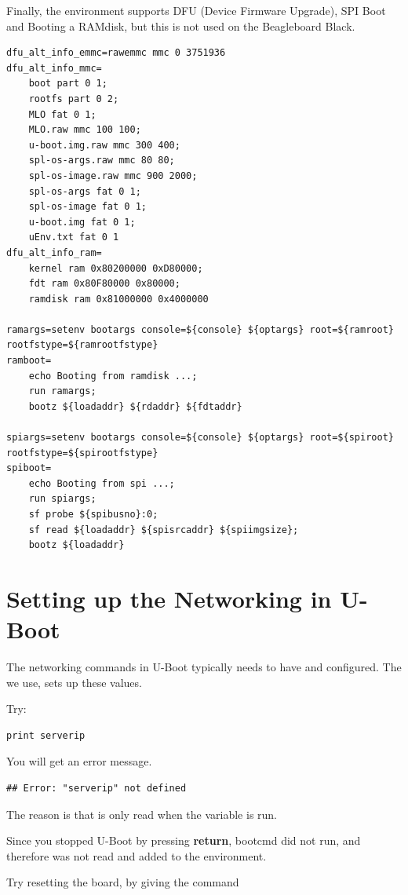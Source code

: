 \clearpage

Finally, the environment supports DFU (Device Firmware Upgrade), SPI Boot and Booting a RAMdisk,
but this is not used on the Beagleboard Black.

\begin{lstlisting}
dfu_alt_info_emmc=rawemmc mmc 0 3751936
dfu_alt_info_mmc=
	boot part 0 1;
	rootfs part 0 2;
	MLO fat 0 1;
	MLO.raw mmc 100 100;
	u-boot.img.raw mmc 300 400;
	spl-os-args.raw mmc 80 80;
	spl-os-image.raw mmc 900 2000;
	spl-os-args fat 0 1;
	spl-os-image fat 0 1;
	u-boot.img fat 0 1;
	uEnv.txt fat 0 1
dfu_alt_info_ram=
	kernel ram 0x80200000 0xD80000;
	fdt ram 0x80F80000 0x80000;
	ramdisk ram 0x81000000 0x4000000

ramargs=setenv bootargs console=${console} ${optargs} root=${ramroot} rootfstype=${ramrootfstype}
ramboot=
	echo Booting from ramdisk ...; 
	run ramargs; 
	bootz ${loadaddr} ${rdaddr} ${fdtaddr}

spiargs=setenv bootargs console=${console} ${optargs} root=${spiroot} rootfstype=${spirootfstype}
spiboot=
	echo Booting from spi ...;
	run spiargs; 
	sf probe ${spibusno}:0; 
	sf read ${loadaddr} ${spisrcaddr} ${spiimgsize}; 
	bootz ${loadaddr}
\end{lstlisting}


\clearpage
\section{Setting up the \devboard Networking in U-Boot}

The networking commands in U-Boot typically needs to have  and 
 configured. The  we use, sets up these values.

Try:

\begin{verbatim}
print serverip
\end{verbatim}

You will get an error message.

\begin{verbatim}
## Error: "serverip" not defined  
\end{verbatim}

The reason is that  is only read when the  variable is run.

Since you stopped U-Boot by pressing {\bf return}, bootcmd did not run,
and therefore  was not read and added to the environment.

Try resetting the board, by giving the command 

